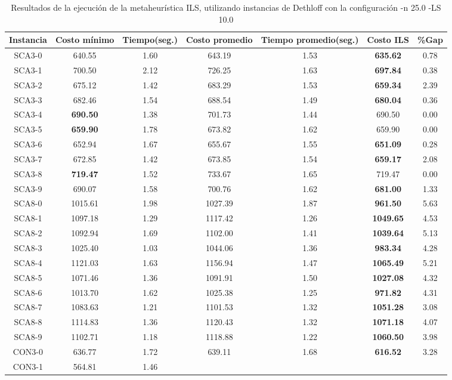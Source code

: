 \begin{table}[ht]
\caption{Resultados de la ejecución de la metaheurística ILS, utilizando instancias de Dethloff con la configuración -n 25.0 -LS 10.0}
\centering
\small
\begin{tabular}{c c c c c c c}
\hline\hline
Instancia & Costo mínimo & Tiempo(seg.) & Costo promedio & Tiempo promedio(seg.) & Costo ILS & \%Gap \\ [0.5ex]
\hline
SCA3-0 & 640.55 & 1.60 & 
643.19 & 1.53 & \bf{635.62} & 
0.78\\SCA3-1 & 700.50 & 2.12 & 
726.25 & 1.63 & \bf{697.84} & 
0.38\\SCA3-2 & 675.12 & 1.42 & 
683.29 & 1.53 & \bf{659.34} & 
2.39\\SCA3-3 & 682.46 & 1.54 & 
688.54 & 1.49 & \bf{680.04} & 
0.36\\SCA3-4 & \bf{690.50} & 1.38 & 
701.73 & 1.44 & 690.50 & 0.00\\
SCA3-5 & \bf{659.90} & 1.78 & 
673.82 & 1.62 & 659.90 & 0.00\\
SCA3-6 & 652.94 & 1.67 & 
655.67 & 1.55 & \bf{651.09} & 
0.28\\SCA3-7 & 672.85 & 1.42 & 
673.85 & 1.54 & \bf{659.17} & 
2.08\\SCA3-8 & \bf{719.47} & 1.52 & 
733.67 & 1.65 & 719.47 & 0.00\\
SCA3-9 & 690.07 & 1.58 & 
700.76 & 1.62 & \bf{681.00} & 
1.33\\SCA8-0 & 1015.61 & 1.98 & 
1027.39 & 1.87 & \bf{961.50} & 
5.63\\SCA8-1 & 1097.18 & 1.29 & 
1117.42 & 1.26 & \bf{1049.65} & 
4.53\\SCA8-2 & 1092.94 & 1.69 & 
1102.00 & 1.41 & \bf{1039.64} & 
5.13\\SCA8-3 & 1025.40 & 1.03 & 
1044.06 & 1.36 & \bf{983.34} & 
4.28\\SCA8-4 & 1121.03 & 1.63 & 
1156.94 & 1.47 & \bf{1065.49} & 
5.21\\SCA8-5 & 1071.46 & 1.36 & 
1091.91 & 1.50 & \bf{1027.08} & 
4.32\\SCA8-6 & 1013.70 & 1.62 & 
1025.38 & 1.25 & \bf{971.82} & 
4.31\\SCA8-7 & 1083.63 & 1.21 & 
1101.53 & 1.32 & \bf{1051.28} & 
3.08\\SCA8-8 & 1114.83 & 1.36 & 
1120.43 & 1.32 & \bf{1071.18} & 
4.07\\SCA8-9 & 1102.71 & 1.18 & 
1118.88 & 1.22 & \bf{1060.50} & 
3.98\\CON3-0 & 636.77 & 1.72 & 
639.11 & 1.68 & \bf{616.52} & 
3.28\\CON3-1 & 564.81 & 1.46 & 

\end{tabular}
\end{table}
